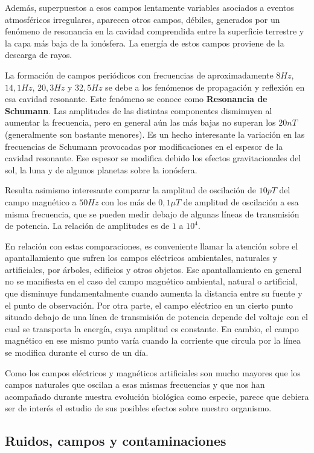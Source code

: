Además, superpuestos a esos campos lentamente variables asociados a eventos atmosféricos irregulares, aparecen otros campos, débiles, generados por un fenómeno de resonancia en la cavidad comprendida entre la superficie terrestre y la capa más baja de la ionósfera. La energía de estos campos proviene de la descarga de rayos.

La formación de campos periódicos con frecuencias de aproximadamente $8 Hz$, $14,1 Hz$, $20,3 Hz$ y $32,5 Hz$ se debe a los fenómenos de propagación y reflexión en esa cavidad resonante. Este fenómeno se conoce como \textbf{Resonancia de Schumann}.
Las amplitudes de las distintas componentes disminuyen al aumentar la frecuencia, pero en general aún las más bajas no superan los $20 nT$ (generalmente son bastante menores).
Es un hecho interesante la variación en las frecuencias de Schumann provocadas por modificaciones en el espesor de la cavidad resonante. Ese espesor se modifica debido los efectos gravitacionales del sol, la luna y de algunos planetas sobre la ionósfera.

Resulta asimismo interesante comparar la amplitud de oscilación de $10 pT$ del campo magnético a $50 Hz$ con los más de $0,1 \mu T$ de amplitud de oscilación a esa misma frecuencia, que se pueden medir debajo de algunas líneas de transmisión de potencia. La relación de amplitudes es de $1$ a $10^{4}$.

En relación con estas comparaciones, es conveniente llamar la atención sobre el apantallamiento que sufren los campos eléctricos ambientales, naturales y artificiales, por árboles, edificios y otros objetos.
Ese apantallamiento en general no se manifiesta en el caso del campo magnético ambiental, natural o artificial, que disminuye fundamentalmente cuando aumenta la distancia entre su fuente y el punto de observación.
Por otra parte, el campo eléctrico en un cierto punto situado debajo de una línea de transmisión de potencia depende del voltaje con el cual se transporta la energía, cuya amplitud es constante. En cambio, el campo magnético en ese mismo punto varía cuando la corriente que circula por la línea se modifica durante el curso de un día.

Como los campos eléctricos y magnéticos artificiales son mucho mayores que los campos naturales que oscilan a esas mismas frecuencias y que nos han acompañado durante nuestra evolución biológica como especie, parece que debiera ser de interés el estudio de sus posibles efectos sobre nuestro organismo.

\subsection{Ruidos, campos y contaminaciones}

